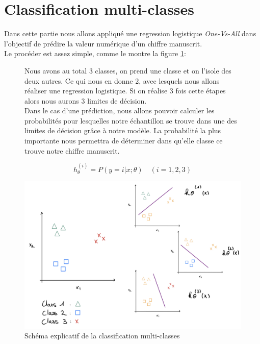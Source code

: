 \clearpage
\section{Classification multi-classes}

Dans cette partie nous allons appliqué une regression logistique \textit{One-Vs-All} dans l'objectif de prédire la valeur numérique d'un chiffre manuscrit. \\

\noindent
Le procéder est assez simple, comme le montre la figure \ref{fig:multi-class-scheme}:

\begin{figure}[!h]
    \begin{minipage}{.48\linewidth}
        Nous avons au total 3 classes, on prend une classe et on l'isole des deux autres.
        Ce qui nous en donne 2, avec lesquels nous allons réaliser une regression logistique. Si on réalise 3 fois cette étapes alors nous aurons 3 limites de décision. \\
        Dans le cas d'une prédiction, nous allons pouvoir calculer les probabilités pour lesquelles notre échantillon se trouve dans une des limites de décision grâce à notre modèle. La probabilité
        la plus importante nous permettra de déterminer dans qu'elle classe ce trouve notre chiffre manuscrit.

        \begin{equation}\label{eq:proba-multi}
            h_{\theta}^{(i)} = P(y=i|x;\theta) \quad (i = 1, 2, 3)
         \end{equation}

    \end{minipage}\hfill
    \begin{minipage}{.48\linewidth}
        \begin{center}
            \includegraphics[width=1\textwidth]{./img/multi-class-scheme.jpeg}
            \caption{\label{fig:multi-class-scheme}Schéma explicatif de la classification multi-classes}  
        \end{center}
    \end{minipage}
\end{figure}

